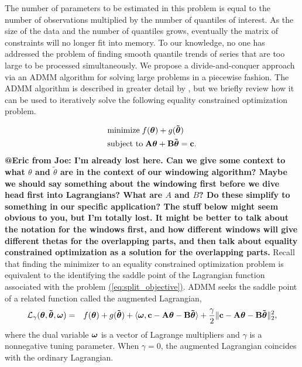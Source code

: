 \documentclass[aoas]{imsart}
\makeatletter
\newcommand{\Eric}[2]{{\bf {\color{green}@Eric from #1: #2}}\xspace}
\newcommand{\Eqn}[1]{\hyperref[eq:#1]{{\rm (\ref*{eq:#1})}}} %
\newcommand{\Eqn}[1]{{(\ref{eq:#1})}} %
\newcommand{\V}[1]{{\bm{\mathbf{\MakeLowercase{#1}}}}} %
\newcommand{\Vtilde}[1]{{\bm{\tilde \mathbf{\MakeLowercase{#1}}}}} %
\newcommand{\M}[1]{{\bm{\mathbf{\MakeUppercase{#1}}}}} %
\makeatother
\begin{document}
The number of parameters to be estimated in this problem is equal to the number of observations multiplied by the number of quantiles of interest. As the size of the data and the number of quantiles grows, eventually the matrix of constraints will no longer fit into memory. To our knowledge, no one has addressed the problem of finding smooth quantile trends of series that are too large to be processed simultaneously. We propose a divide-and-conquer approach via an ADMM algorithm for solving large problems in a piecewise fashion. The ADMM algorithm \citep{gabay1975dual, glowinski1975approximation} is  described in greater detail by \cite{boyd2011distributed}, but we briefly review how it can be used to iteratively solve the following equality constrained optimization problem.

\begin{equation}
\label{eq:split_objective}
\begin{split}
&\text{minimize} \; f(\V{\theta}) + g(\Vtilde{\theta}) \\
&\text{subject to} \; \M{A}\V{\theta} + \M{B}\Vtilde{\theta} = \V{c}.
\end{split}
\end{equation}
\Eric{Joe}{I'm already lost here. Can we give some context to what $\theta$ and $\widetilde{\theta}$ are in the context of our windowing algorithm? Maybe we should say something about the windowing first before we dive head first into Lagrangians? What are $A$ and $B$? Do these simplify to something in our specific application? The stuff below might seem obvious to you, but I'm totally lost. It might be better to talk about the notation for the windows first, and how different windows will give different thetas for the overlapping parts, and then talk about equality constrained optimization as a solution for the overlapping parts.} Recall that finding the minimizer to an equality constrained optimization problem is equivalent to the identifying the saddle point of the Lagrangian function associated with the problem \Eqn{split_objective}. ADMM seeks the saddle point of a related function called the augmented Lagrangian,
\begin{eqnarray*}
	\mathcal{L}_{\gamma}(\V{\theta},\Vtilde{\theta},\V{\omega}) & = & f(\V{\theta}) + g(\Vtilde{\theta}) + \langle \V{\omega}, \V{c} - \M{A}\V{\theta} - \M{B}\Vtilde{\theta} \rangle
	+ \frac{\gamma}{2} \lVert \V{c} - \M{A}\V{\theta} - \M{B}\Vtilde{\theta} \rVert_2^2,
\end{eqnarray*}
where the dual variable $\V{\omega}$ is a vector of Lagrange multipliers and $\gamma$ is a nonnegative tuning parameter. When $\gamma = 0$, the augmented Lagrangian coincides with the ordinary Lagrangian.
\end{document}
